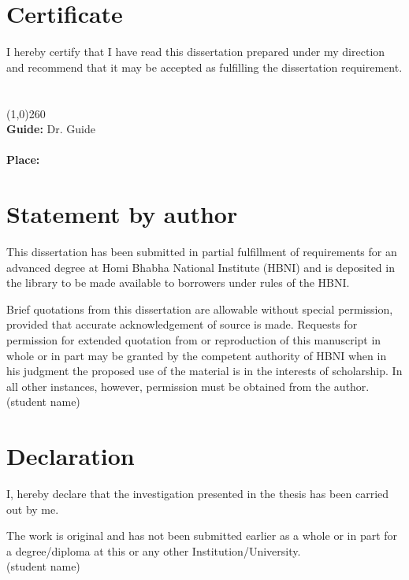 \documentclass[11pt,oneside,a4paper]{book}
\def\student{student name}
\begin{document}
\chapter*{{Certificate}}
\thispagestyle{empty}
I hereby certify that I have read this dissertation prepared under my direction
and recommend that it may be accepted as fulfilling the dissertation
requirement.\\\\\\
\line(1,0){260}\\
{\bf Guide: }{Dr. Guide}\\\\
{\bf Place: }
\clearpage

\chapter*{{Statement by author}}
\thispagestyle{empty}
This dissertation has been submitted in partial fulfillment of requirements
for an advanced degree at Homi Bhabha National Institute
(HBNI) and is deposited in the library to be made available to borrowers
under rules of the HBNI.

Brief quotations from this dissertation are allowable without special
permission, provided that accurate acknowledgement of source is made.
Requests for permission for extended quotation from or reproduction
of this manuscript in whole or in part may be granted by the competent
authority of HBNI when in his judgment the proposed use
of the material is in the interests of scholarship. In all other instances,
however, permission must be obtained from the author.\\[2.5cm]
\phantom{.}\hfill {(\student)}\phantom{XXX}

\chapter*{{Declaration}}
\thispagestyle{empty}

I, hereby declare that the investigation presented in the thesis has been
carried out by me.

The work is original and has not been submitted earlier as a whole
or in part for a degree/diploma at this or any other Institution/University.\\[2.5cm]
\phantom{.}\hfill {(\student)}\phantom{XXX}
\end{document}
